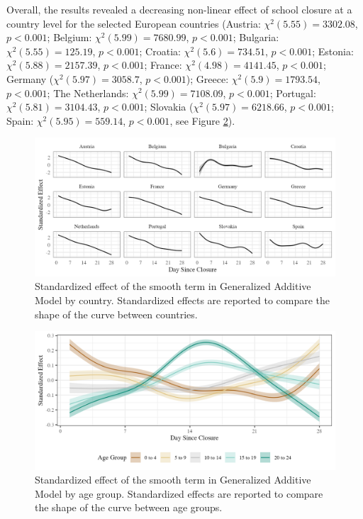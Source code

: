 \documentclass[]{interact}
\theoremstyle{plain}%
\theoremstyle{definition}
\theoremstyle{remark}
\begin{document}
Overall, the results revealed a decreasing non-linear effect of school closure at a country level for the selected European countries (Austria: \(\chi^2(5.55) = 3302.08\), \(p < 0.001\); Belgium: \(\chi^2(5.99) = 7680.99\), \(p < 0.001\); Bulgaria: \(\chi^2(5.55) = 125.19\), \(p < 0.001\); Croatia: \(\chi^2(5.6) = 734.51\), \(p < 0.001\); Estonia: \(\chi^2(5.88) = 2157.39\), \(p < 0.001\); France: \(\chi^2(4.98) = 4141.45\), \(p < 0.001\); Germany (\(\chi^2(5.97) = 3058.7\), \(p < 0.001\)); Greece: \(\chi^2(5.9) = 1793.54\), \(p < 0.001\); The Netherlands: \(\chi^2(5.99) = 7108.09\), \(p < 0.001\); Portugal: \(\chi^2(5.81) = 3104.43\), \(p < 0.001\); Slovakia (\(\chi^2(5.97) = 6218.66\), \(p < 0.001\); Spain: \(\chi^2(5.95) = 559.14\), \(p < 0.001\), see Figure \ref{fig:age}).

\begin{figure}
\includegraphics[width=\textwidth]{manuscript_files/figure-latex/country-1} \caption{Standardized effect of the smooth term in Generalized Additive Model by country. Standardized effects are reported to compare the shape of the curve between countries.}\label{fig:country}
\end{figure}

\begin{figure}
\includegraphics[width=\textwidth]{manuscript_files/figure-latex/age-1} \caption{Standardized effect of the smooth term in Generalized Additive Model by age group. Standardized effects are reported to compare the shape of the curve between age groups.}\label{fig:age}
\end{figure}
\end{document}
